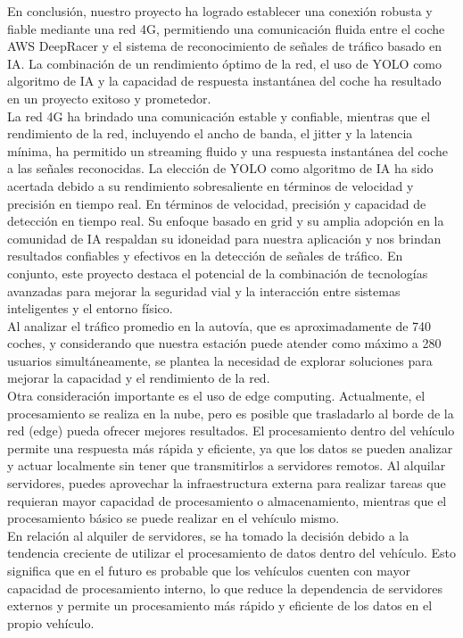 En conclusión, nuestro proyecto ha logrado establecer una conexión robusta y fiable mediante una red 4G, permitiendo una comunicación fluida entre el coche AWS DeepRacer y el sistema de reconocimiento de señales de tráfico basado en IA. La combinación de un rendimiento óptimo de la red, el uso de YOLO como algoritmo de IA y la capacidad de respuesta instantánea del coche ha resultado en un proyecto exitoso y prometedor.\\

La red 4G ha brindado una comunicación estable y confiable, mientras que el rendimiento de la red, incluyendo el ancho de banda, el jitter y la latencia mínima, ha permitido un streaming fluido y una respuesta instantánea del coche a las señales reconocidas. La elección de YOLO como algoritmo de IA ha sido acertada debido a su rendimiento sobresaliente en términos de velocidad y precisión en tiempo real. En términos de velocidad, precisión y capacidad de detección en tiempo real. Su enfoque basado en grid y su amplia adopción en la comunidad de IA respaldan su idoneidad para nuestra aplicación y nos brindan resultados confiables y efectivos en la detección de señales de tráfico. En conjunto, este proyecto destaca el potencial de la combinación de tecnologías avanzadas para mejorar la seguridad vial y la interacción entre sistemas inteligentes y el entorno físico.\\

Al analizar el tráfico promedio en la autovía, que es aproximadamente de 740 coches, y considerando que nuestra estación puede atender como máximo a 280 usuarios simultáneamente, se plantea la necesidad de explorar soluciones para mejorar la capacidad y el rendimiento de la red.\\

Otra consideración importante es el uso de edge computing. Actualmente, el procesamiento se realiza en la nube, pero es posible que trasladarlo al borde de la red (edge) pueda ofrecer mejores resultados. El procesamiento dentro del vehículo permite una respuesta más rápida y eficiente, ya que los datos se pueden analizar y actuar localmente sin tener que transmitirlos a servidores remotos. Al alquilar servidores, puedes aprovechar la infraestructura externa para realizar tareas que requieran mayor capacidad de procesamiento o almacenamiento, mientras que el procesamiento básico se puede realizar en el vehículo mismo.\\

En relación al alquiler de servidores, se ha tomado la decisión debido a la tendencia creciente de utilizar el procesamiento de datos dentro del vehículo. Esto significa que en el futuro es probable que los vehículos cuenten con mayor capacidad de procesamiento interno, lo que reduce la dependencia de servidores externos y permite un procesamiento más rápido y eficiente de los datos en el propio vehículo.